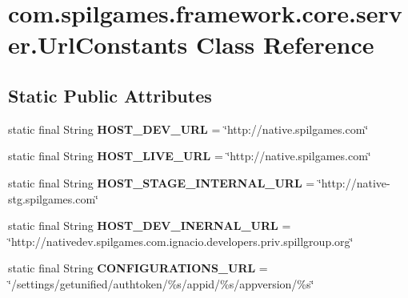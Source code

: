 \hypertarget{classcom_1_1spilgames_1_1framework_1_1core_1_1server_1_1_url_constants}{\section{com.\-spilgames.\-framework.\-core.\-server.\-Url\-Constants Class Reference}
\label{classcom_1_1spilgames_1_1framework_1_1core_1_1server_1_1_url_constants}
}
\subsection*{Static Public Attributes}
\begin{DoxyCompactItemize}
\item 
\hypertarget{classcom_1_1spilgames_1_1framework_1_1core_1_1server_1_1_url_constants_ab685af70383f2f3b88edba7153c28150}{static final String {\bfseries H\-O\-S\-T\-\_\-\-D\-E\-V\-\_\-\-U\-R\-L} = \char`\"{}http\-://native.\-spilgames.\-com\char`\"{}}\label{classcom_1_1spilgames_1_1framework_1_1core_1_1server_1_1_url_constants_ab685af70383f2f3b88edba7153c28150}

\item 
\hypertarget{classcom_1_1spilgames_1_1framework_1_1core_1_1server_1_1_url_constants_a62f5d61f9ce5c5b48cce96e8eabf378a}{static final String {\bfseries H\-O\-S\-T\-\_\-\-L\-I\-V\-E\-\_\-\-U\-R\-L} = \char`\"{}http\-://native.\-spilgames.\-com\char`\"{}}\label{classcom_1_1spilgames_1_1framework_1_1core_1_1server_1_1_url_constants_a62f5d61f9ce5c5b48cce96e8eabf378a}

\item 
\hypertarget{classcom_1_1spilgames_1_1framework_1_1core_1_1server_1_1_url_constants_aea3e4977a1faad15862e1b06a24938df}{static final String {\bfseries H\-O\-S\-T\-\_\-\-S\-T\-A\-G\-E\-\_\-\-I\-N\-T\-E\-R\-N\-A\-L\-\_\-\-U\-R\-L} = \char`\"{}http\-://native-\/stg.\-spilgames.\-com\char`\"{}}\label{classcom_1_1spilgames_1_1framework_1_1core_1_1server_1_1_url_constants_aea3e4977a1faad15862e1b06a24938df}

\item 
\hypertarget{classcom_1_1spilgames_1_1framework_1_1core_1_1server_1_1_url_constants_acb45337e8fb49ce83ea2487a034c4380}{static final String {\bfseries H\-O\-S\-T\-\_\-\-D\-E\-V\-\_\-\-I\-N\-E\-R\-N\-A\-L\-\_\-\-U\-R\-L} = \char`\"{}http\-://nativedev.\-spilgames.\-com.\-ignacio.\-developers.\-priv.\-spillgroup.\-org\char`\"{}}\label{classcom_1_1spilgames_1_1framework_1_1core_1_1server_1_1_url_constants_acb45337e8fb49ce83ea2487a034c4380}

\item 
\hypertarget{classcom_1_1spilgames_1_1framework_1_1core_1_1server_1_1_url_constants_a6496c9c7235c7965ad287007652f5b43}{static final String {\bfseries C\-O\-N\-F\-I\-G\-U\-R\-A\-T\-I\-O\-N\-S\-\_\-\-U\-R\-L} = \char`\"{}/settings/getunified/authtoken/\%s/appid/\%s/appversion/\%s\char`\"{}}\label{classcom_1_1spilgames_1_1framework_1_1core_1_1server_1_1_url_constants_a6496c9c7235c7965ad287007652f5b43}

\end{DoxyCompactItemize}


